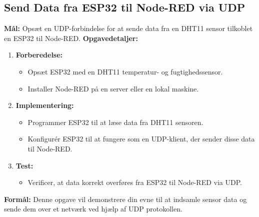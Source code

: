 \subsection*{Send Data fra ESP32 til Node-RED via UDP}
\textbf{Mål:} Opsæt en UDP-forbindelse for at sende data fra en DHT11 sensor tilkoblet en ESP32 til Node-RED.
\newline\newline\noindent
\textbf{Opgavedetaljer:}
\begin{enumerate}
	\item \textbf{Forberedelse:}
	\begin{itemize}
		\item Opsæt ESP32 med en DHT11 temperatur- og fugtighedssensor.
		\item Installer Node-RED på en server eller en lokal maskine.
	\end{itemize}
	\item \textbf{Implementering:}
	\begin{itemize}
		\item Programmer ESP32 til at læse data fra DHT11 sensoren.
		\item Konfigurér ESP32 til at fungere som en UDP-klient, der sender disse data til Node-RED.
	\end{itemize}
	\item \textbf{Test:}
	\begin{itemize}
		\item Verificer, at data korrekt overføres fra ESP32 til Node-RED via UDP.
	\end{itemize}
\end{enumerate}
\textbf{Formål:} Denne opgave vil demonstrere din evne til at indsamle sensor data og sende dem over et netværk ved hjælp af UDP protokollen.


